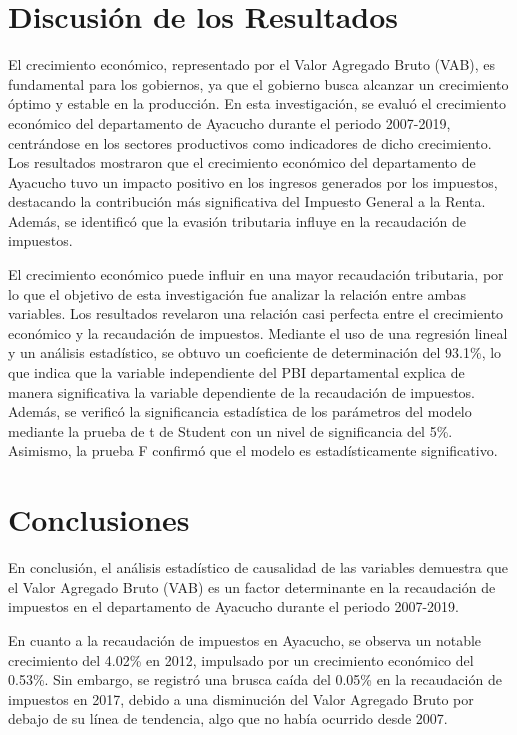 \documentclass[
  letterpaper,
]{article}
\begin{document}
\hypertarget{discusiuxf3n-de-los-resultados}{%
\section{Discusión de los
Resultados}\label{discusiuxf3n-de-los-resultados}}

El crecimiento económico, representado por el Valor Agregado Bruto
(VAB), es fundamental para los gobiernos, ya que el gobierno busca
alcanzar un crecimiento óptimo y estable en la producción. En esta
investigación, se evaluó el crecimiento económico del departamento de
Ayacucho durante el periodo 2007-2019, centrándose en los sectores
productivos como indicadores de dicho crecimiento. Los resultados
mostraron que el crecimiento económico del departamento de Ayacucho tuvo
un impacto positivo en los ingresos generados por los impuestos,
destacando la contribución más significativa del Impuesto General a la
Renta. Además, se identificó que la evasión tributaria influye en la
recaudación de impuestos.

El crecimiento económico puede influir en una mayor recaudación
tributaria, por lo que el objetivo de esta investigación fue analizar la
relación entre ambas variables. Los resultados revelaron una relación
casi perfecta entre el crecimiento económico y la recaudación de
impuestos. Mediante el uso de una regresión lineal y un análisis
estadístico, se obtuvo un coeficiente de determinación del 93.1\%, lo
que indica que la variable independiente del PBI departamental explica
de manera significativa la variable dependiente de la recaudación de
impuestos. Además, se verificó la significancia estadística de los
parámetros del modelo mediante la prueba de t de Student con un nivel de
significancia del 5\%. Asimismo, la prueba F confirmó que el modelo es
estadísticamente significativo.

\hypertarget{conclusiones}{%
\section{Conclusiones}\label{conclusiones}}

En conclusión, el análisis estadístico de causalidad de las variables
demuestra que el Valor Agregado Bruto (VAB) es un factor determinante en
la recaudación de impuestos en el departamento de Ayacucho durante el
periodo 2007-2019.

En cuanto a la recaudación de impuestos en Ayacucho, se observa un
notable crecimiento del 4.02\% en 2012, impulsado por un crecimiento
económico del 0.53\%. Sin embargo, se registró una brusca caída del
0.05\% en la recaudación de impuestos en 2017, debido a una disminución
del Valor Agregado Bruto por debajo de su línea de tendencia, algo que
no había ocurrido desde 2007.
\end{document}
